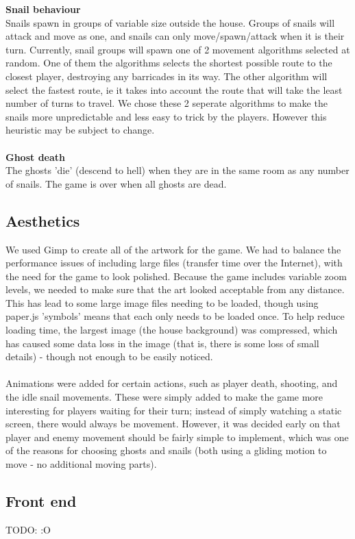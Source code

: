 \documentclass{article}
\begin{document}
\textbf{Snail behaviour} \\
Snails spawn in groups of variable size outside the house. Groups of snails will attack and move as one, and snails can only move/spawn/attack when it is their turn. Currently, snail groups will spawn one of 2 movement algorithms selected at random. One of them the algorithms selects the shortest possible route to the closest player, destroying any barricades in its way. The other algorithm will select the fastest route, ie it takes into account the route that will take the least number of turns to travel. We chose these 2 seperate algorithms to make the snails more unpredictable and less easy to trick by the players. However this heuristic may be subject to change. \\ \\
\textbf{Ghost death} \\
The ghosts 'die' (descend to hell) when they are in the same room as any number of snails. The game is over when all ghosts are dead.

\subsection{Aesthetics}
We used Gimp to create all of the artwork for the game. We had to balance the performance issues of including large files (transfer time over the Internet), with the need for the game to look polished. Because the game includes variable zoom levels, we needed to make sure that the art looked acceptable from any distance. This has lead to some large image files needing to be loaded, though using paper.js 'symbols' means that each only needs to be loaded once. To help reduce loading time, the largest image (the house background) was compressed, which has caused some data loss in the image (that is, there is some loss of small details) - though not enough to be easily noticed. \\ \\
Animations were added for certain actions, such as player death, shooting, and the idle snail movements. These were simply added to make the game more interesting for players waiting for their turn; instead of simply watching a static screen, there would always be movement. However, it was decided early on that player and enemy movement should be fairly simple to implement, which was one of the reasons for choosing ghosts and snails (both using a gliding motion to move - no additional moving parts).

\subsection{Front end}
TODO: :O
\end{document}
